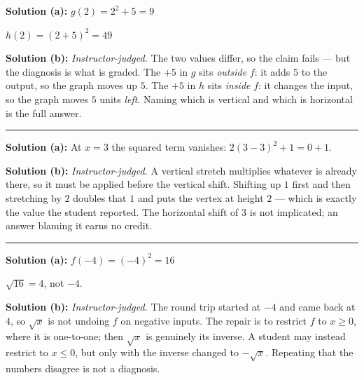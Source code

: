 \documentclass[12pt]{article}
\begin{document}



\textbf{Solution (a):} $g(2) = 2^{2} + 5 = 9$ 

\noindent $h(2) = (2 + 5)^{2} = 49$ 

\textbf{Solution (b):} \emph{Instructor-judged.} The two values differ, so the claim fails --- but the diagnosis is what is graded. The $+5$ in $g$ sits \emph{outside} $f$: it adds $5$ to the output, so the graph moves up $5$. The $+5$ in $h$ sits \emph{inside} $f$: it changes the input, so the graph moves $5$ units \emph{left}. Naming which is vertical and which is horizontal is the full answer.

\vspace{0.1cm}\noindent\rule{\linewidth}{0.2pt}


\textbf{Solution (a):} At $x = 3$ the squared term vanishes: $2(3-3)^{2} + 1 = 0 + 1$. 

\textbf{Solution (b):} \emph{Instructor-judged.} A vertical stretch multiplies whatever is already there, so it must be applied before the vertical shift. Shifting up $1$ first and then stretching by $2$ doubles that $1$ and puts the vertex at height $2$ --- which is exactly the value the student reported. The horizontal shift of $3$ is not implicated; an answer blaming it earns no credit.

\vspace{0.1cm}\noindent\rule{\linewidth}{0.2pt}


\textbf{Solution (a):} $f(-4) = (-4)^{2} = 16$ 

\noindent $\sqrt{16} = 4$, not $-4$. 

\textbf{Solution (b):} \emph{Instructor-judged.} The round trip started at $-4$ and came back at $4$, so $\sqrt{x}$ is not undoing $f$ on negative inputs. The repair is to restrict $f$ to $x \geq 0$, where it is one-to-one; then $\sqrt{x}$ is genuinely its inverse. A student may instead restrict to $x \leq 0$, but only with the inverse changed to $-\sqrt{x}$. Repeating that the numbers disagree is not a diagnosis.
\end{document}
